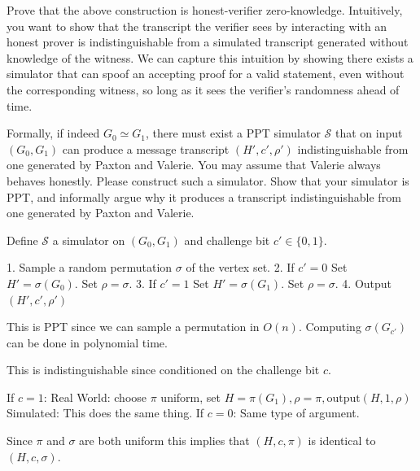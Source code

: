 \documentclass[12pt, letterpaper]{article}
\renewcommand{\t}[1]{\text{#1}}
\begin{document}
\begin{subproblem}{}
    Prove that the above construction is honest-verifier zero-knowledge. 
Intuitively, 
you want to show that the transcript the verifier sees by interacting with an honest prover is indistinguishable from a simulated transcript generated without knowledge of the witness.
We can capture this intuition by showing there exists a simulator that can spoof an accepting proof for a valid statement, even without the corresponding witness, so long as it sees the verifier's randomness ahead of time.

Formally, if indeed $G_0 \simeq G_1$, there must exist a PPT simulator $\mathcal{S}$ that on input $(G_0, G_1)$ can produce a message transcript $(H', c', \rho')$ indistinguishable from one generated by Paxton and Valerie. You may assume that Valerie always behaves honestly.
Please construct such a simulator. 
Show that your simulator is PPT, and informally argue why it produces a transcript indistinguishable from one generated by Paxton and Valerie.
\end{subproblem}
\begin{problemproof}
    Define $\mathcal{S}$ a simulator on $(G_0,G_1)$ and challenge bit $c' \in \{0,1\}$.

    1. Sample a random permutation $\sigma$ of the vertex set.
    2. If $c'=0$
        Set $H'=\sigma(G_0)$.
        Set $\rho=\sigma$.
    3. If $c'=1$
        Set $H'=\sigma(G_1)$.
        Set $\rho=\sigma$.
    4. Output $(H',c',\rho')$

    This is PPT since we can sample a permutation in $O(n)$.
    Computing $\sigma(G_{c'})$ can be done in polynomial time.

    This is indistinguishable since conditioned on the challenge bit $c$.
    
    If $c=1$:
        Real World: choose $\pi$ uniform, set $H=\pi(G_1), \rho=\pi, \t{output} (H,1,\rho)$
        Simulated: This does the same thing.
    If $c=0$:
        Same type of argument.
        
    Since $\pi$ and $\sigma$ are both uniform this implies that $(H,c,\pi)$ is identical to $(H,c,\sigma)$.
\end{problemproof}
\end{document}
